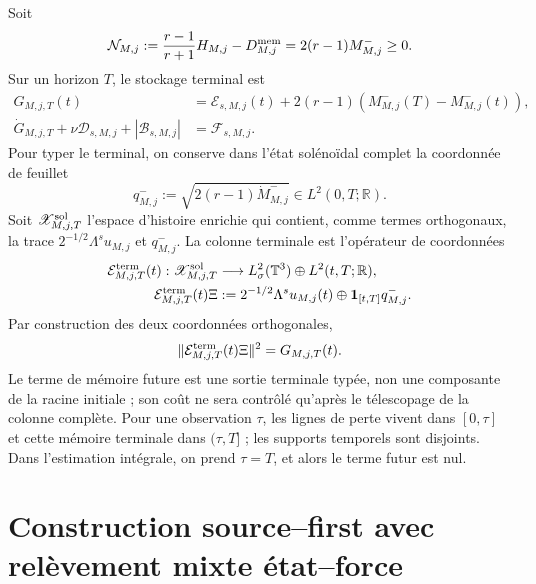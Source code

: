 Soit
\[
 \mathcal N_{M,j}:=
 \frac{r-1}{r+1}H_{M,j}-D_{M,j}^{\rm mem}
 =2(r-1)M_{M,j}^-\ge0.
\]
Sur un horizon $T$, le stockage terminal est
\begin{equation}\label{eq:pdf2-ns-storage}
 \begin{aligned}
 G_{M,j,T}(t)
 &=\mathscr E_{s,M,j}(t)+2(r-1)(M^-_{M,j}(T)-M^-_{M,j}(t)),\\
 \dot G_{M,j,T}+\nu\mathscr D_{s,M,j}+|\mathscr B_{s,M,j}|
 &=\mathscr F_{s,M,j}.
 \end{aligned}
\end{equation}
Pour typer le terminal, on conserve dans l'état solénoïdal complet la coordonnée
de feuillet
\[
 q^-_{M,j}:=\sqrt{2(r-1)\dot M^-_{M,j}}
 \in L^2(0,T;\mathbb R).
\]
Soit $\mathscr X^{\rm sol}_{M,j,T}$ l'espace d'histoire enrichie qui contient,
comme termes orthogonaux, la trace $2^{-1/2}\Lambda^su_{M,j}$ et $q^-_{M,j}$.
La colonne terminale est l'opérateur de coordonnées
\begin{equation}\label{eq:pdf2-ns-terminal-column}
 \begin{aligned}
 \mathcal E_{M,j,T}^{\rm term}(t):\mathscr X^{\rm sol}_{M,j,T}
 &\longrightarrow L^2_\sigma(\mathbb T^3)
   \oplus L^2(t,T;\mathbb R),\\
 \mathcal E_{M,j,T}^{\rm term}(t)\Xi
 &:=2^{-1/2}\Lambda^su_{M,j}(t)
 \oplus\mathbf1_{[t,T]}q^-_{M,j}.
 \end{aligned}
\end{equation}
Par construction des deux coordonnées orthogonales,
\begin{equation}\label{eq:pdf2-ns-terminal-column-gram}
 \|\mathcal E_{M,j,T}^{\rm term}(t)\Xi\|^2
 =G_{M,j,T}(t).
\end{equation}
Le terme de mémoire future est une sortie terminale typée, non une composante de la
racine initiale ; son coût ne sera contrôlé qu'après le télescopage de la colonne
complète. Pour une observation $\tau$, les lignes de perte vivent dans
$[0,\tau]$ et cette mémoire terminale dans $(\tau,T]$ ; les supports temporels sont
disjoints. Dans l'estimation intégrale, on prend $\tau=T$, et alors le terme
futur est nul.

\section{Construction source--first avec relèvement mixte état--force}

